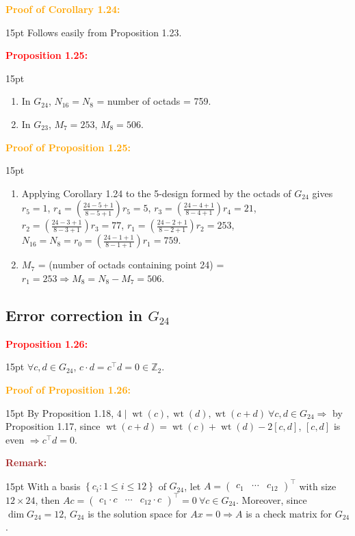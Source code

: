 \documentclass[12pt]{article}
\newcommand{\noparskip}{\vspace{-\parskip}}
\newenvironment{points}
	{\begin{enumerate}[label = (\arabic*)]}
	{\end{enumerate}}
\newenvironment{dent}
	{\begin{adjustwidth}{15pt}{}\noparskip}
	{\end{adjustwidth}}
\newenvironment{result}[1]
	{\textcolor{Red}{\textbf{#1:}}\begin{dent}}
	{\end{dent}}
\newenvironment{proof}[1]
	{\textcolor{Orange}{\textbf{Proof of #1:}}\begin{dent}}
	{\end{dent}}
\newenvironment{remark}
	{\textcolor{Brown}{\textbf{Remark:}}\begin{dent}}
	{\end{dent}}
\renewcommand{\implies}{\Rightarrow}
\newcommand{\set}[1]{\left\{ #1 \right\}}
\newcommand{\Z}{\mathbb{Z}}
\newcommand{\wt}[1]{\operatorname{wt}(#1)}
\begin{document}
\begin{proof}{Corollary 1.24}
Follows easily from Proposition 1.23.
\end{proof}

\begin{result}{Proposition 1.25}
\begin{points}
\item In $G_{24}$, $N_{16} = N_8$ = number of octads = 759.
\item In $G_{23}$, $M_7 = 253$, $M_8 = 506$.
\end{points}
\end{result}

\begin{proof}{Proposition 1.25}
\begin{points}
\item Applying Corollary 1.24 to the 5-design formed by the octads of $G_{24}$ gives $r_5 = 1$, $r_4 = \left( \frac{24 - 5 + 1}{8 - 5 + 1} \right) r_5 = 5$, $r_3 = \left( \frac{24 - 4 + 1}{8 - 4 + 1} \right) r_4 = 21$, $r_2 = \left( \frac{24 - 3 + 1}{8 - 3 + 1} \right) r_3 = 77$, $r_1 = \left( \frac{24 - 2 + 1}{8 - 2 + 1} \right) r_2 = 253$, $N_{16} = N_8 = r_0 = \left( \frac{24 - 1 + 1}{8 - 1 + 1} \right) r_1 = 759$.
\item $M_7$ = (number of octads containing point 24) = $r_1 = 253 \implies M_8 = N_8 - M_7 = 506$.
\end{points}
\end{proof}

\subsection{Error correction in $G_{24}$}

\begin{result}{Proposition 1.26}
$\forall c, d \in G_{24}$, $c \cdot d = c^\top d = 0 \in \Z_2$.
\end{result}

\begin{proof}{Proposition 1.26}
By Proposition 1.18, $4 \mid \wt{c}, \wt{d}, \wt{c + d}\ \forall c, d \in G_{24} \implies$ by Proposition 1.17, since $\wt{c + d} = \wt{c} + \wt{d} - 2[c, d]$, $[c, d]$ is even $\implies c^\top d = 0$.
\end{proof}

\begin{remark}
With a basis $\set{c_i: 1 \le i \le 12}$ of $G_{24}$, let $A = \begin{pmatrix} c_1 & \cdots & c_{12} \end{pmatrix}^\top$ with size $12 \times 24$, then $Ac = \begin{pmatrix} c_1 \cdot c & \cdots & c_{12} \cdot c \end{pmatrix}^\top = 0\ \forall c \in G_{24}$. Moreover, since $\dim G_{24} = 12$, $G_{24}$ is the solution space for $Ax = 0 \implies A$ is a check matrix for $G_{24}$.
\end{remark}
\end{document}
